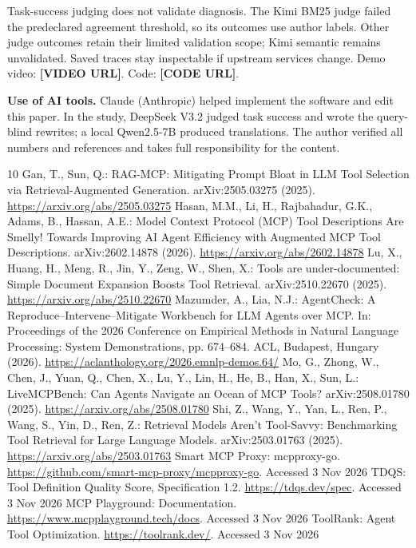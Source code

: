 \documentclass[runningheads,a4paper]{llncs}
\begin{document}
Task-success judging does not validate diagnosis. The Kimi BM25 judge failed the predeclared agreement threshold, so its outcomes use author labels. Other judge outcomes retain their limited validation scope; Kimi semantic remains unvalidated. Saved traces stay inspectable if upstream services change. Demo video: \textbf{[VIDEO URL]}. Code: \textbf{[CODE URL]}.

\textbf{Use of AI tools.} Claude (Anthropic) helped implement the software and edit this paper. In the study, DeepSeek V3.2 judged task success and wrote the query-blind rewrites; a local Qwen2.5-7B produced translations. The author verified all numbers and references and takes full responsibility for the content.

\clearpage
\begin{thebibliography}{10}
 Gan, T., Sun, Q.: RAG-MCP: Mitigating Prompt Bloat in LLM Tool Selection via Retrieval-Augmented Generation. arXiv:2505.03275 (2025). \url{https://arxiv.org/abs/2505.03275}
 Hasan, M.M., Li, H., Rajbahadur, G.K., Adams, B., Hassan, A.E.: Model Context Protocol (MCP) Tool Descriptions Are Smelly! Towards Improving AI Agent Efficiency with Augmented MCP Tool Descriptions. arXiv:2602.14878 (2026). \url{https://arxiv.org/abs/2602.14878}
 Lu, X., Huang, H., Meng, R., Jin, Y., Zeng, W., Shen, X.: Tools are under-documented: Simple Document Expansion Boosts Tool Retrieval. arXiv:2510.22670 (2025). \url{https://arxiv.org/abs/2510.22670}
 Mazumder, A., Lia, N.J.: AgentCheck: A Reproduce--Intervene--Mitigate Workbench for LLM Agents over MCP. In: Proceedings of the 2026 Conference on Empirical Methods in Natural Language Processing: System Demonstrations, pp. 674--684. ACL, Budapest, Hungary (2026). \url{https://aclanthology.org/2026.emnlp-demos.64/}
 Mo, G., Zhong, W., Chen, J., Yuan, Q., Chen, X., Lu, Y., Lin, H., He, B., Han, X., Sun, L.: LiveMCPBench: Can Agents Navigate an Ocean of MCP Tools? arXiv:2508.01780 (2025). \url{https://arxiv.org/abs/2508.01780}
 Shi, Z., Wang, Y., Yan, L., Ren, P., Wang, S., Yin, D., Ren, Z.: Retrieval Models Aren't Tool-Savvy: Benchmarking Tool Retrieval for Large Language Models. arXiv:2503.01763 (2025). \url{https://arxiv.org/abs/2503.01763}
 Smart MCP Proxy: mcpproxy-go. \url{https://github.com/smart-mcp-proxy/mcpproxy-go}. Accessed 3 Nov 2026
 TDQS: Tool Definition Quality Score, Specification 1.2. \url{https://tdqs.dev/spec}. Accessed 3 Nov 2026
 MCP Playground: Documentation. \url{https://www.mcpplayground.tech/docs}. Accessed 3 Nov 2026
 ToolRank: Agent Tool Optimization. \url{https://toolrank.dev/}. Accessed 3 Nov 2026
\end{thebibliography}
\end{document}
